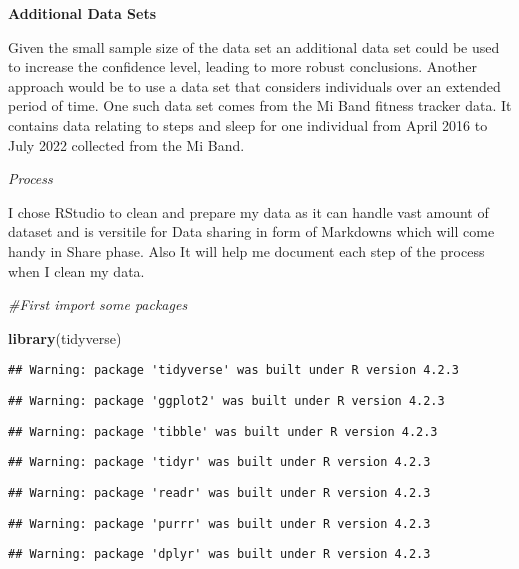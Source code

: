 \documentclass[
]{article}
\newenvironment{Shaded}{\begin{snugshade}}{\end{snugshade}}
\newcommand{\CommentTok}[1]{\textcolor[rgb]{0.56,0.35,0.01}{\textit{#1}}}
\newcommand{\FunctionTok}[1]{\textcolor[rgb]{0.13,0.29,0.53}{\textbf{#1}}}
\newcommand{\NormalTok}[1]{#1}
\begin{document}
\textbf{Additional Data Sets}

Given the small sample size of the data set an additional data set could
be used to increase the confidence level, leading to more robust
conclusions. Another approach would be to use a data set that considers
individuals over an extended period of time. One such data set comes
from the Mi Band fitness tracker data. It contains data relating to
steps and sleep for one individual from April 2016 to July 2022
collected from the Mi Band.

\emph{Process}

I chose RStudio to clean and prepare my data as it can handle vast
amount of dataset and is versitile for Data sharing in form of Markdowns
which will come handy in Share phase. Also It will help me document each
step of the process when I clean my data.

\begin{Shaded}
\begin{Highlighting}[]
\CommentTok{\#First import some packages}

\FunctionTok{library}\NormalTok{(tidyverse) }
\end{Highlighting}
\end{Shaded}

\begin{verbatim}
## Warning: package 'tidyverse' was built under R version 4.2.3
\end{verbatim}

\begin{verbatim}
## Warning: package 'ggplot2' was built under R version 4.2.3
\end{verbatim}

\begin{verbatim}
## Warning: package 'tibble' was built under R version 4.2.3
\end{verbatim}

\begin{verbatim}
## Warning: package 'tidyr' was built under R version 4.2.3
\end{verbatim}

\begin{verbatim}
## Warning: package 'readr' was built under R version 4.2.3
\end{verbatim}

\begin{verbatim}
## Warning: package 'purrr' was built under R version 4.2.3
\end{verbatim}

\begin{verbatim}
## Warning: package 'dplyr' was built under R version 4.2.3
\end{verbatim}
\end{document}
